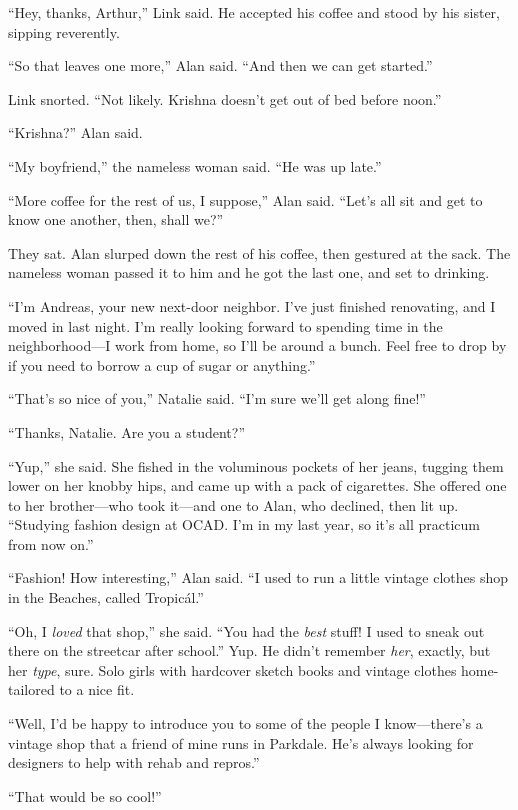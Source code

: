 ``Hey, thanks, Arthur,'' Link said.  He accepted his coffee and stood
by his sister, sipping reverently.

``So that leaves one more,'' Alan said.  ``And then we can get
started.''

Link snorted.  ``Not likely.  Krishna doesn't get out of bed before
noon.''

``Krishna?'' Alan said.

``My boyfriend,'' the nameless woman said.  ``He was up late.''

``More coffee for the rest of us, I suppose,'' Alan said.  ``Let's all
sit and get to know one another, then, shall we?''

They sat.  Alan slurped down the rest of his coffee, then gestured at
the sack.  The nameless woman passed it to him and he got the last
one, and set to drinking.

``I'm Andreas, your new next-door neighbor.  I've just finished
renovating, and I moved in last night.  I'm really looking forward to
spending time in the neighborhood---I work from home, so I'll be
around a bunch.  Feel free to drop by if you need to borrow a cup of
sugar or anything.''

``That's so nice of you,'' Natalie said.  ``I'm sure we'll get along
fine!''

``Thanks, Natalie.  Are you a student?''

``Yup,'' she said.  She fished in the voluminous pockets of her jeans,
tugging them lower on her knobby hips, and came up with a pack of
cigarettes.  She offered one to her brother---who took it---and one to
Alan, who declined, then lit up.  ``Studying fashion design at OCAD. 
I'm in my last year, so it's all practicum from now on.''

``Fashion!  How interesting,'' Alan said.  ``I used to run a little
vintage clothes shop in the Beaches, called Tropic\'{a}l.''

``Oh, I \textit{loved} that shop,'' she said.  ``You had the
\textit{best} stuff!  I used to sneak out there on the streetcar after
school.'' Yup.  He didn't remember \textit{her}, exactly, but her
\textit{type}, sure.  Solo girls with hardcover sketch books and
vintage clothes home-tailored to a nice fit.

``Well, I'd be happy to introduce you to some of the people I
know---there's a vintage shop that a friend of mine runs in Parkdale. 
He's always looking for designers to help with rehab and repros.''

``That would be so cool!''

